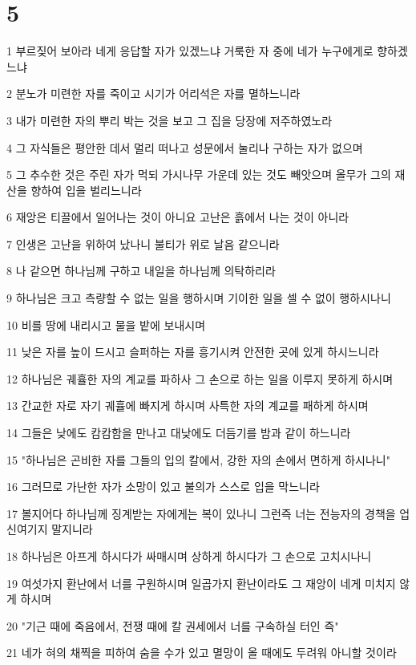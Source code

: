 \chapter{5}

\par 1 부르짖어 보아라 네게 응답할 자가 있겠느냐 거룩한 자 중에 네가 누구에게로 향하겠느냐
\par 2 분노가 미련한 자를 죽이고 시기가 어리석은 자를 멸하느니라
\par 3 내가 미련한 자의 뿌리 박는 것을 보고 그 집을 당장에 저주하였노라
\par 4 그 자식들은 평안한 데서 멀리 떠나고 성문에서 눌리나 구하는 자가 없으며
\par 5 그 추수한 것은 주린 자가 먹되 가시나무 가운데 있는 것도 빼앗으며 올무가 그의 재산을 향하여 입을 벌리느니라
\par 6 재앙은 티끌에서 일어나는 것이 아니요 고난은 흙에서 나는 것이 아니라
\par 7 인생은 고난을 위하여 났나니 불티가 위로 날음 같으니라
\par 8 나 같으면 하나님께 구하고 내일을 하나님께 의탁하리라
\par 9 하나님은 크고 측량할 수 없는 일을 행하시며 기이한 일을 셀 수 없이 행하시나니
\par 10 비를 땅에 내리시고 물을 밭에 보내시며
\par 11 낮은 자를 높이 드시고 슬퍼하는 자를 흥기시켜 안전한 곳에 있게 하시느니라
\par 12 하나님은 궤휼한 자의 계교를 파하사 그 손으로 하는 일을 이루지 못하게 하시며
\par 13 간교한 자로 자기 궤휼에 빠지게 하시며 사특한 자의 계교를 패하게 하시며
\par 14 그들은 낮에도 캄캄함을 만나고 대낮에도 더듬기를 밤과 같이 하느니라
\par 15 "하나님은 곤비한 자를 그들의 입의 칼에서, 강한 자의 손에서 면하게 하시나니"
\par 16 그러므로 가난한 자가 소망이 있고 불의가 스스로 입을 막느니라
\par 17 볼지어다 하나님께 징계받는 자에게는 복이 있나니 그런즉 너는 전능자의 경책을 업신여기지 말지니라
\par 18 하나님은 아프게 하시다가 싸매시며 상하게 하시다가 그 손으로 고치시나니
\par 19 여섯가지 환난에서 너를 구원하시며 일곱가지 환난이라도 그 재앙이 네게 미치지 않게 하시며
\par 20 "기근 때에 죽음에서, 전쟁 때에 칼 권세에서 너를 구속하실 터인 즉"
\par 21 네가 혀의 채찍을 피하여 숨을 수가 있고 멸망이 올 때에도 두려워 아니할 것이라
